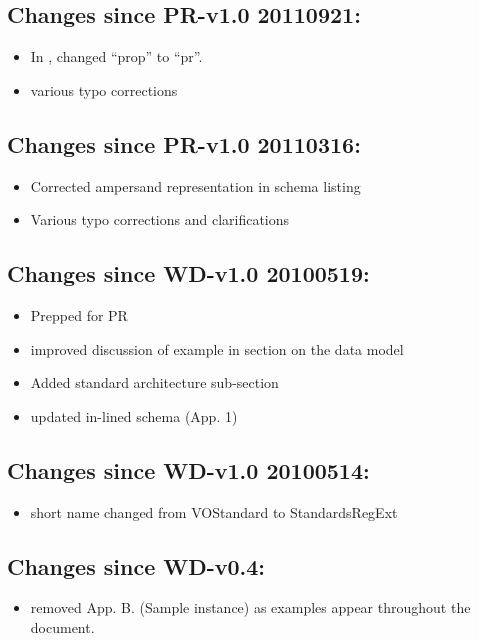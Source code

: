 \documentclass[11pt,a4paper]{ivoa}
\begin{document}
\subsection{Changes since PR-v1.0 20110921:}

\begin{itemize}

\item  In , changed ``prop'' to ``pr''.

\item  various typo corrections

\end{itemize}

\subsection{Changes since PR-v1.0 20110316:}

\begin{itemize}

\item Corrected ampersand representation in schema listing

\item Various typo corrections and clarifications

\end{itemize}

\subsection{Changes since WD-v1.0 20100519:}

\begin{itemize}

\item  Prepped for PR

\item  improved discussion of example in section on the data model

\item  Added standard architecture sub-section

\item  updated in-lined schema (App. 1)

\end{itemize}

\subsection{Changes since WD-v1.0 20100514:}

\begin{itemize}

\item  short name changed from VOStandard to StandardsRegExt

\end{itemize}

\subsection{Changes since WD-v0.4:}

\begin{itemize}

\item  removed App. B. (Sample instance) as examples appear throughout
       the document.

\end{itemize}


\end{document}
